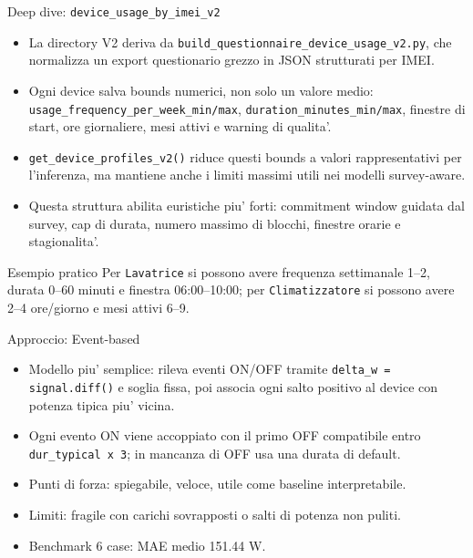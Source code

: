 \documentclass[aspectratio=169]{beamer}
\newcommand{\code}[1]{\texttt{#1}}
\begin{document}
\begin{frame}{Deep dive: \code{device\_usage\_by\_imei\_v2}}
\small
\begin{itemize}
  \item La directory V2 deriva da \code{build\_questionnaire\_device\_usage\_v2.py}, che normalizza un export questionario grezzo in JSON strutturati per IMEI.
  \item Ogni device salva bounds numerici, non solo un valore medio: \code{usage\_frequency\_per\_week\_min/max}, \code{duration\_minutes\_min/max}, finestre di start, ore giornaliere, mesi attivi e warning di qualita'.
  \item \code{get\_device\_profiles\_v2()} riduce questi bounds a valori rappresentativi per l'inferenza, ma mantiene anche i limiti massimi utili nei modelli survey-aware.
  \item Questa struttura abilita euristiche piu' forti: commitment window guidata dal survey, cap di durata, numero massimo di blocchi, finestre orarie e stagionalita'.
\end{itemize}

\vspace{0.4em}
\begin{block}{Esempio pratico}
\small
Per \code{Lavatrice} si possono avere frequenza settimanale 1--2, durata 0--60 minuti e finestra 06:00--10:00; per \code{Climatizzatore} si possono avere 2--4 ore/giorno e mesi attivi 6--9.
\end{block}
\end{frame}

\begin{frame}{Approccio: Event-based}
\small
\begin{itemize}
  \item Modello piu' semplice: rileva eventi ON/OFF tramite \code{delta\_w = signal.diff()} e soglia fissa, poi associa ogni salto positivo al device con potenza tipica piu' vicina.
  \item Ogni evento ON viene accoppiato con il primo OFF compatibile entro \code{dur\_typical x 3}; in mancanza di OFF usa una durata di default.
  \item Punti di forza: spiegabile, veloce, utile come baseline interpretabile.
  \item Limiti: fragile con carichi sovrapposti o salti di potenza non puliti.
  \item Benchmark 6 case: MAE medio 151.44 W.
\end{itemize}
\end{frame}
\end{document}
